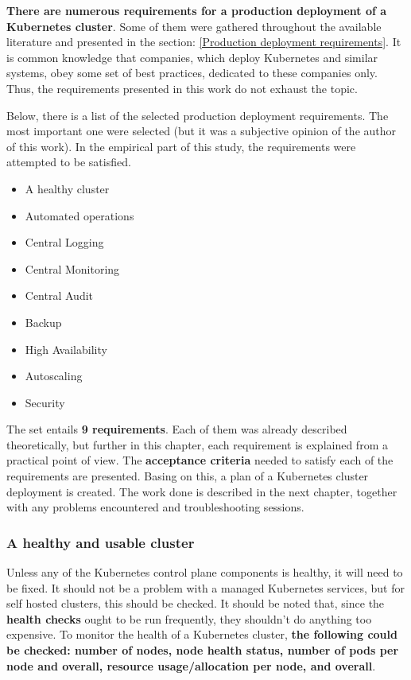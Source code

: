 \textbf{There are numerous requirements for a production deployment of a Kubernetes cluster}. Some of them were gathered throughout the available literature and presented in the section: \ref{Production deployment requirements}. It is common knowledge that companies, which deploy Kubernetes and similar systems, obey some set of best practices, dedicated to these companies only. Thus, the requirements presented in this work do not exhaust the topic.

Below, there is a list of the selected production deployment requirements. The most important one were selected (but it was a subjective opinion of the author of this work). In the empirical part of this study, the requirements were  attempted to be satisfied.
\begin{itemize}
\item A healthy cluster
\item Automated operations
\item Central Logging
\item Central Monitoring
\item Central Audit
\item Backup
\item High Availability
\item Autoscaling
\item Security
\end{itemize}

The set entails \textbf{9 requirements}. Each of them was already described theoretically, but further in this chapter, each requirement is explained from a practical point of view. The \textbf{acceptance criteria} needed to satisfy each of the requirements are presented. Basing on this, a plan of a Kubernetes cluster deployment is created. The work done is described in the next chapter, together with any problems encountered and troubleshooting sessions.

\subsubsection{A healthy and usable cluster}
\label{A healthy cluster}

Unless any of the Kubernetes control plane components is healthy, it will need to be fixed. It should not be a problem with a managed Kubernetes services, but for self hosted clusters, this should be checked. It should be noted that, since the \textbf{health checks} ought to be run frequently, they shouldn't do anything too expensive. To monitor the health of a Kubernetes cluster, \textbf{the following could be checked: number of nodes, node health status, number of pods per node and overall, resource usage/allocation per node, and overall}\cite{book-cndwk}.

